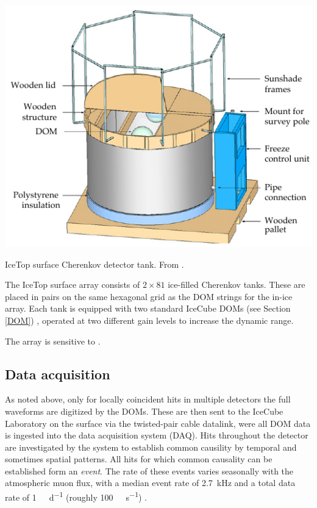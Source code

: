 \documentclass[
    a4paper, %
    fontsize=10pt, %
    twoside=false, %
    numbers=noenddot, %
    fontmethod=tex,
]{kaobook}
\begin{document}
\begin{marginfigure}
    \includegraphics{ic/ic_icetop.pdf}
    \caption[IceTop detector]{IceTop surface Cherenkov detector tank. From \cite{Abbasi2013}.}
\end{marginfigure}

The IceTop surface array consists of $2\times81$ ice-filled Cherenkov tanks. These are placed in pairs on the same hexagonal grid as the DOM strings for the in-ice array. Each tank is equipped with two standard IceCube DOMs (see Section \ref{DOM}) \cite{Abbasi2013}, operated at two different gain levels to increase the dynamic range.

The array is sensitive to .

\subsection{Data acquisition}\label{data_acquisition}
As noted above, only for locally coincident hits in multiple detectors the full waveforms are digitized by the DOMs. These are then sent to the IceCube Laboratory on the surface via the twisted-pair cable datalink, were all DOM data is ingested into the data acquisition system (DAQ). Hits throughout the detector are investigated by the system to establish common causility by temporal and sometimes spatial patterns. All hits for which common causality can be established form an \textit{event}. The rate of these events varies seasonally with the atmospheric muon flux, with a median event rate of \SI{2.7}{\kilo\Hz} and a total data rate of \SI{1}{\tera\byte\per\day} (roughly \SI{100}{\mega\bit\per\second}) \cite{Aartsen2017}.
\end{document}
